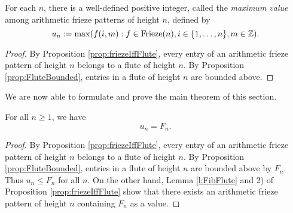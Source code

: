 \begin{corollary}
    \label{l:maxDefined}
    \leanok
    For each $n$, there is a well-defined
    positive integer, called the {\it maximum value} among arithmetic frieze patterns of height $n$, defined by
    \[
        u_n := \max ( f (i,m) : f \in  {\rm Frieze}(n), i \in \{1,\ldots, n\}, m \in \mathbb{Z}).
    \]
\end{corollary}
\begin{proof}
    By Proposition \ref{prop:friezeIffFlute}, every entry of an arithmetic frieze pattern of height $n$ belongs to a flute of height $n$.
    By Proposition \ref{prop:FluteBounded}, entries in a flute of height $n$ are bounded above.
\end{proof}


We are now able to formulate and prove the main theorem of this section.
\begin{theorem}
    \label{mainTheorem}
    \leanok
    For all $n \geq 1$, we have 
    \[
        u_n = F_{n}.
    \]    
\end{theorem}
\begin{proof}
    By Proposition \ref{prop:friezeIffFlute}, every entry of an arithmetic frieze pattern of height $n$ belongs to a flute of height $n$.
    By Proposition \ref{prop:FluteBounded}, entries in a flute of height $n$ are bounded above by $F_n$. Thus $u_n \leq F_n$ for all $n$. 
On the other hand, Lemma \ref{l:FibFlute} and 2) of Proposition \ref{prop:friezeIffFlute} show that 
there exists an arithmetic frieze pattern of height $n$ containing $F_n$ as a value.
\end{proof}